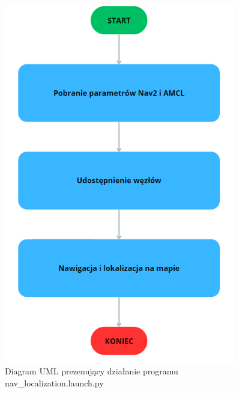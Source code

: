 \documentclass[a4paper,twoside,12pt]{book}
\begin{document}
\begin{figure}[!hb]
	\centering
	\includegraphics[width=0.9\textwidth]{images/uml-nav.png}
	\caption{Diagram UML prezenujący działanie programu nav\_localization.launch.py}
	\label{fig:diagram-nav}
\end{figure}




 
\end{document}
